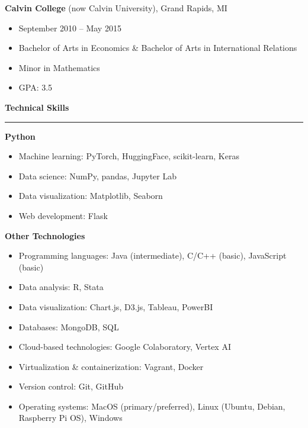 \documentclass[a4paper, 11pt]{article}
\begin{document}
      {\textbf{Calvin College} (now Calvin University), Grand Rapids, MI
      \begin{itemize}
        \item September 2010 -- May 2015
        \item Bachelor of Arts in Economics \& Bachelor of Arts in International Relations
        \item Minor in Mathematics
        \item GPA: 3.5
      \end{itemize}}


    \vspace{.5em}
    {\noindent\large\textbf{Technical Skills}\par}\vspace{.25em}
    \hrule
    \vspace{1em}

      \textbf{Python}
      \begin{itemize}
        \item Machine learning: PyTorch, HuggingFace, scikit-learn, Keras
        \item Data science: NumPy, pandas, Jupyter Lab
        \item Data visualization: Matplotlib, Seaborn
        \item Web development: Flask
      \end{itemize}


      \textbf{Other Technologies}
      \begin{itemize}
        \item Programming languages: Java (intermediate), C/C++ (basic), JavaScript (basic)
        \item Data analysis: R, Stata
        \item Data visualization: Chart.js, D3.js, Tableau, PowerBI
        \item Databases: MongoDB, SQL
        \item Cloud-based technologies: Google Colaboratory, Vertex AI
        \item Virtualization \& containerization: Vagrant, Docker
        \item Version control: Git, GitHub
        \item Operating systems: MacOS (primary/preferred), Linux (Ubuntu, Debian, Raspberry Pi OS), Windows
      \end{itemize}
\end{document}
